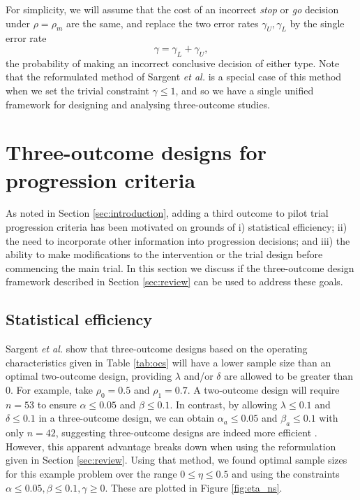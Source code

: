 \documentclass[sagev]{sagej}
\begin{document}
For simplicity, we will assume that the cost of an incorrect \emph{stop} or \emph{go} decision under $\rho = \rho_m$ are the same, and replace the two error rates $\gamma_U, \gamma_L$ by the single error rate
$$
\gamma = \gamma_L + \gamma_U,
$$
the probability of making an incorrect conclusive decision of either type. Note that the reformulated method of Sargent \emph{et al.} is a special case of this method when we set the trivial constraint $\gamma \leq 1$, and so we have a single unified framework for designing and analysing three-outcome studies.

\section{Three-outcome designs for progression criteria}\label{sec:methods}

As noted in Section \ref{sec:introduction}, adding a third outcome to pilot trial progression criteria has been motivated on grounds of i) statistical efficiency; ii) the need to incorporate other information into progression decisions; and iii) the ability to make modifications to the intervention or the trial design before commencing the main trial. In this section we discuss if the three-outcome design framework described in Section \ref{sec:review} can be used to address these goals.

\subsection{Statistical efficiency}\label{sec:efficiency}

Sargent \emph{et al.} show that three-outcome designs based on the operating characteristics given in Table \ref{tab:ocs} will have a lower sample size than an optimal two-outcome design, providing $\lambda$ and/or $\delta$ are allowed to be greater than 0. For example, take $\rho_0 = 0.5$ and $\rho_1 = 0.7$. A two-outcome design will require $n = 53$ to ensure $\alpha \leq 0.05$ and $\beta \leq 0.1$. In contrast, by allowing $\lambda \leq 0.1$ and $\delta \leq 0.1$ in a three-outcome design, we can obtain $\alpha_a \leq 0.05$ and $\beta_a \leq 0.1$ with only $n = 42$, suggesting three-outcome designs are indeed more efficient \cite{Sargent2001, Hong2007}. However, this apparent advantage breaks down when using the reformulation given in Section \ref{sec:review}. Using that method, we found optimal sample sizes for this example problem over the range $0 \leq \eta \leq 0.5$ and using the constraints $\alpha \leq 0.05, \beta \leq 0.1, \gamma \geq 0$. These are plotted in Figure \ref{fig:eta_ns}.
\end{document}
